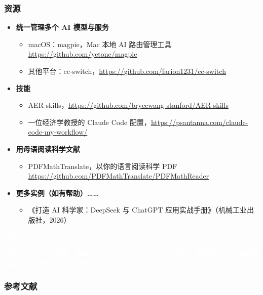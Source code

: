 \documentclass[aspectratio=169]{beamer}
\newcommand{\referencesize}{\tiny}
\begin{document}
\begin{frame}
  \frametitle{资源}
  \begin{itemize}
      \item \textbf{统一管理多个 AI 模型与服务}
        \begin{itemize}
          \item macOS：magpie，Mac 本地 AI 路由管理工具 \url{https://github.com/yetone/magpie}
          \item 其他平台：cc-switch，\url{https://github.com/farion1231/cc-switch}
        \end{itemize}
      \item \textbf{技能}
        \begin{itemize}
          \item AER-skills，\url{https://github.com/brycewang-stanford/AER-skills}
          \item 一位经济学教授的 Claude Code 配置，\url{https://psantanna.com/claude-code-my-workflow/}
        \end{itemize}
      \item \textbf{用母语阅读科学文献}
        \begin{itemize}
          \item PDFMathTranslate，以你的语言阅读科学 PDF \url{https://github.com/PDFMathTranslate/PDFMathReader} \parencite{ouyang-etal-2025-pdfmathtranslate}
        \end{itemize}
      \item \textbf{更多实例（如有帮助）……}
        \begin{itemize}
          \item 《打造 AI 科学家：DeepSeek 与 ChatGPT 应用实战手册》（机械工业出版社，2026）
        \end{itemize}
  \end{itemize}
\end{frame}


{
  \begin{frame}
    \begin{center}
      \Huge{\textcolor{white}{致谢}}
    \end{center}
    \vspace{1cm}
    \normalsize{\textcolor{white}{感谢林鸿展、李彦霖、李昊、陆子奇、王龙、湛北、于建钧、秦清华在本主题早期构思阶段与我的交流。文责自负。}}
  \end{frame}
}



\begin{frame}[allowframebreaks]
  \frametitle{参考文献}
  \begingroup
  \referencesize\color{black}
  \printbibliography[notkeyword=chinese,heading=none]
  \endgroup
\end{frame}
\end{document}
